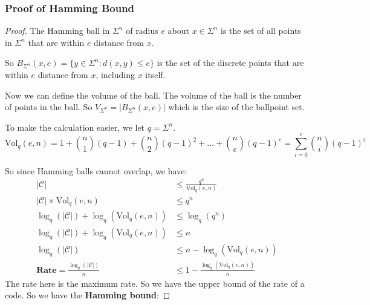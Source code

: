\documentclass[letterpaper,12pt]{article}
\begin{document}
\subsubsection{Proof of Hamming Bound}
\begin{proof}

    The Hamming ball in $\Sigma^n$ of radius $e$ about $x\in \Sigma^n$ is the set
    of all points in $\Sigma^n$ that are within $e$ distance from $x$.

    So $B_{\Sigma^n} (x,e)=\{y\in \Sigma^n: d(x,y)\le e\}$ is the set of the
    discrete points that are within $e$ distance from $x$, including $x$ itself.

    Now we can define the volume of the ball. The volume of the ball is the number
    of points in the ball. So $V_{\Sigma^n}=|B_{\Sigma^n} (x,e)|$ which is the size
    of the ballpoint set.

    To make the calculation easier, we let $q = \Sigma^n$. \[
        \text{Vol}_q(e,n)= 1+ \binom{n}{1}(q-1)+\binom{n}{2}(q-1)^2+\ldots+\binom{n}{e}(q-1)^e=\sum_{i=0}^{e}\binom{n}{i}(q-1)^i
    \]

    So since Hamming balls cannot overlap, we have: \begin{align*}
        |\mathcal{C}|                                   & \le \frac{q^n}{\text{Vol}_q(e,n)}         \\
        |\mathcal{C}|\times \text{Vol}_q(e,n)           & \le q^n                                   \\
        \log_q(|\mathcal{C}|)+\log_q(\text{Vol}_q(e,n)) & \le \log_q(q^n)                           \\
        \log_q(|\mathcal{C}|)+\log_q(\text{Vol}_q(e,n)) & \le n                                     \\
        \log_q(|\mathcal{C}|)                           & \le n-\log_q(\text{Vol}_q(e,n))           \\
        \textbf{Rate}= \frac{\log_q(|\mathcal{C}|)}{n}  & \le 1-\frac{\log_q(\text{Vol}_q(e,n))}{n}
    \end{align*}
    The rate here is the maximum rate. So we have the upper bound of the rate of a code. So we have the \textbf{Hamming bound}:
\end{proof}
\end{document}

